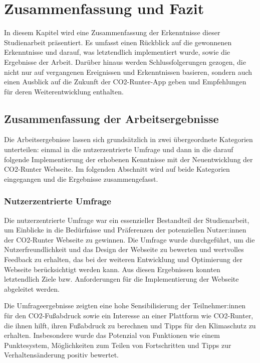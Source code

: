 
\chapter{Zusammenfassung und Fazit}
\label{chapter:7}

In diesem Kapitel wird eine Zusammenfassung der Erkenntnisse dieser Studienarbeit präsentiert. Es umfasst einen Rückblick auf die gewonnenen Erkenntnisse und darauf, was letztendlich implementiert wurde, sowie die Ergebnisse der Arbeit. Darüber hinaus werden Schlussfolgerungen gezogen, die nicht nur auf vergangenen Ereignissen und Erkenntnissen basieren, sondern auch einen Ausblick auf die Zukunft der CO2-Runter-App geben und Empfehlungen für deren Weiterentwicklung enthalten.

\section{Zusammenfassung der Arbeitsergebnisse}

Die Arbeitsergebnisse lassen sich grundsätzlich in zwei übergeordnete Kategorien unterteilen: einmal in die nutzerzentrierte Umfrage und dann in die darauf folgende Implementierung der erhobenen Kenntnisse mit der Neuentwicklung der CO2-Runter Webseite. Im folgenden Abschnitt wird auf beide Kategorien eingegangen und die Ergebnisse zusammengefasst.

\subsection{Nutzerzentrierte Umfrage}

Die nutzerzentrierte Umfrage war ein essenzieller Bestandteil der Studienarbeit, um Einblicke in die Bedürfnisse und Präferenzen der potenziellen Nutzer:innen der CO2-Runter Webseite zu gewinnen. Die Umfrage wurde durchgeführt, um die Nutzerfreundlichkeit und das Design der Webseite zu bewerten und wertvolles Feedback zu erhalten, das bei der weiteren Entwicklung und Optimierung der Webseite berücksichtigt werden kann. Aus diesen Ergebnissen konnten letztendlich Ziele bzw. Anforderungen für die Implementierung der Webseite abgeleitet werden.

Die Umfrageergebnisse zeigten eine hohe Sensibilisierung der Teilnehmer:innen für den CO2-Fußabdruck sowie ein Interesse an einer Plattform wie CO2-Runter, die ihnen hilft, ihren Fußabdruck zu berechnen und Tipps für den Klimaschutz zu erhalten. Insbesondere wurde das Potenzial von Funktionen wie einem Punktesystem, Möglichkeiten zum Teilen von Fortschritten und Tipps zur Verhaltensänderung positiv bewertet.

